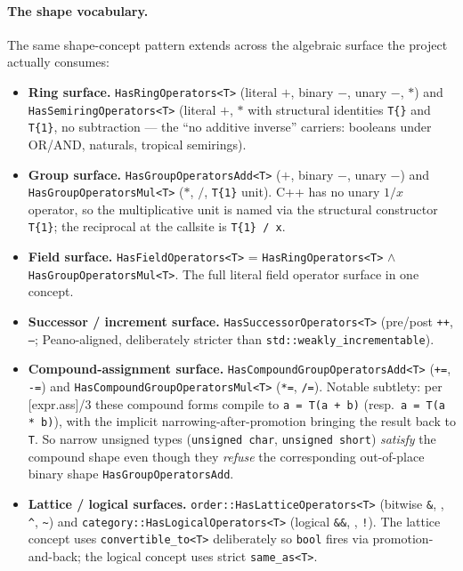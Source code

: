 \documentclass[11pt, a4paper]{report}
\begin{document}
\paragraph{The shape vocabulary.} The same shape-concept pattern extends across the algebraic surface the project actually consumes:

\begin{itemize}
  \item \textbf{Ring surface.} \texttt{HasRingOperators<T>} (literal $+$, binary $-$, unary $-$, $*$) and \texttt{HasSemiringOperators<T>} (literal $+$, $*$ with structural identities \texttt{T\{\}} and \texttt{T\{1\}}, no subtraction --- the ``no additive inverse'' carriers: booleans under OR/AND, naturals, tropical semirings).
  \item \textbf{Group surface.} \texttt{HasGroupOperatorsAdd<T>} ($+$, binary $-$, unary $-$) and \texttt{HasGroupOperatorsMul<T>} ($*$, $/$, \texttt{T\{1\}} unit). C++ has no unary $1/x$ operator, so the multiplicative unit is named via the structural constructor \texttt{T\{1\}}; the reciprocal at the callsite is \texttt{T\{1\} / x}.
  \item \textbf{Field surface.} \texttt{HasFieldOperators<T>} = \texttt{HasRingOperators<T>} $\wedge$ \texttt{HasGroupOperatorsMul<T>}. The full literal field operator surface in one concept.
  \item \textbf{Successor / increment surface.} \texttt{HasSuccessorOperators<T>} (pre/post \texttt{++}, \texttt{--}; Peano-aligned, deliberately stricter than \texttt{std::weakly\_incrementable}).
  \item \textbf{Compound-assignment surface.} \texttt{HasCompoundGroupOperatorsAdd<T>} (\texttt{+=}, \texttt{-=}) and \texttt{HasCompoundGroupOperatorsMul<T>} (\texttt{*=}, \texttt{/=}). Notable subtlety: per [expr.ass]/3 these compound forms compile to \texttt{a = T(a + b)} (resp.\ \texttt{a = T(a * b)}), with the implicit narrowing-after-promotion bringing the result back to \texttt{T}. So narrow unsigned types (\texttt{unsigned char}, \texttt{unsigned short}) \emph{satisfy} the compound shape even though they \emph{refuse} the corresponding out-of-place binary shape \texttt{HasGroupOperatorsAdd}.
  \item \textbf{Lattice / logical surfaces.} \texttt{order::HasLatticeOperators<T>} (bitwise \texttt{\&}, \texttt{\textbar}, \texttt{\textasciicircum}, \texttt{\textasciitilde}) and \texttt{category::HasLogicalOperators<T>} (logical \texttt{\&\&}, \texttt{\textbar\textbar}, \texttt{!}). The lattice concept uses \texttt{convertible\_to<T>} deliberately so \texttt{bool} fires via promotion-and-back; the logical concept uses strict \texttt{same\_as<T>}.
\end{itemize}
\end{document}
